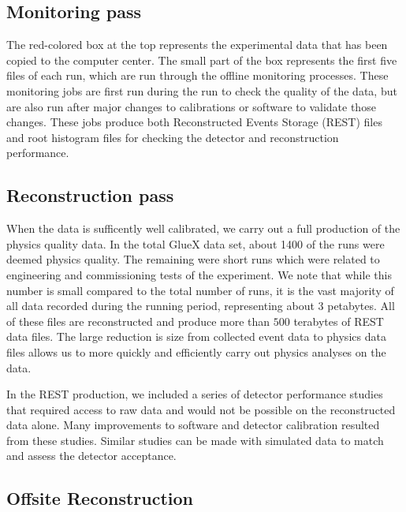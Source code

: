 \subsection{Monitoring pass \label{sec:recmonitoring}}

The red-colored box at the top represents the experimental data that has been copied to the computer center. The small part of the box represents the first five files of each run, which are run through the offline monitoring processes. These monitoring jobs are first run during the run to check the quality of the data, but are also run after major changes to calibrations or software to validate those changes. These jobs produce both Reconstructed Events Storage (REST) files and root histogram files for checking the detector and reconstruction performance.

\subsection{Reconstruction pass \label{sec:recreconstruction}}

When the data is sufficently well calibrated, we carry out a full production of the physics quality data. In the total GlueX data set, about 1400 of the
runs were deemed physics quality. The remaining were short runs which were related to engineering and commissioning tests of the experiment. We note that while this number is small compared to the total number of runs, it is the vast majority of all data recorded during the running period, representing about 3 petabytes. All of these files are reconstructed and produce more than $500$ terabytes of REST data files. The large reduction is size from collected event data to physics data files allows us to  more quickly and efficiently carry out physics analyses on the data.

In the REST production, we included a series of detector performance studies that required access to raw data and would not be possible on the reconstructed data alone. Many improvements to software and detector calibration resulted from these studies. Similar studies can be made with simulated data to match and assess the detector acceptance.

\subsection{Offsite Reconstruction}
\label{sec:recoffsite}

